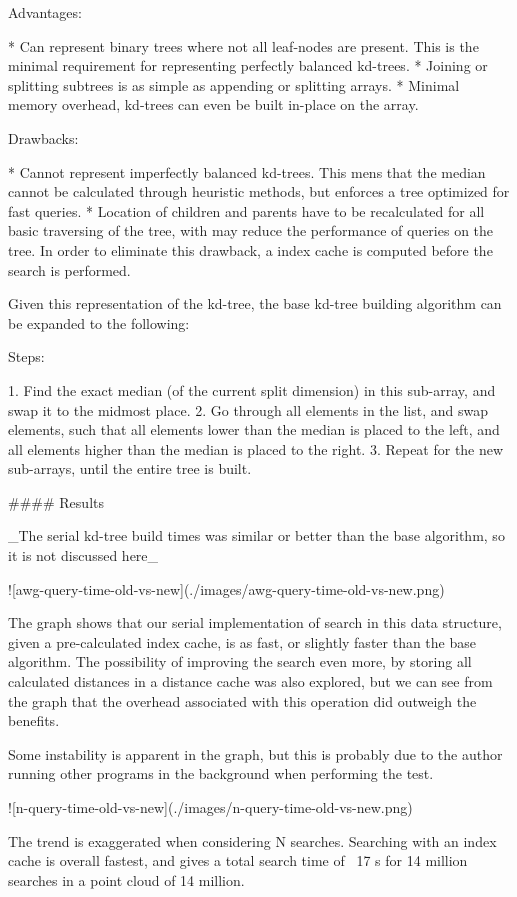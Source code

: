 Advantages:

* Can represent binary trees where not all leaf-nodes are present. This is the minimal requirement for representing perfectly balanced kd-trees.
* Joining or splitting subtrees is as simple as appending or splitting arrays.
* Minimal memory overhead, kd-trees can even be built in-place on the array.

Drawbacks:

* Cannot represent imperfectly balanced kd-trees. This mens that the median cannot be calculated through heuristic methods, but enforces a tree optimized for fast queries.
* Location of children and parents have to be recalculated for all basic traversing of the tree, with may reduce the performance of queries on the tree. In order to eliminate this drawback, a index cache is computed before the search is performed.

Given this representation of the kd-tree, the base kd-tree building algorithm can be expanded to the following:

Steps:

1. Find the exact median (of the current split dimension) in this sub-array, and swap it to the midmost place.
2. Go through all elements in the list, and swap elements, such that all elements lower than the median is placed to the left, and all elements higher than the median is placed to the right.
3. Repeat for the new sub-arrays, until the entire tree is built.

#### Results

_The serial kd-tree build times was similar or better than the base algorithm, so it is not discussed here_

![awg-query-time-old-vs-new](./images/awg-query-time-old-vs-new.png)

The graph shows that our serial implementation of search in this data structure, given a pre-calculated index cache, is as fast, or slightly faster than the base algorithm. The possibility of improving the search even more, by storing all calculated distances in a distance cache was also explored, but we can see from the graph that the overhead associated with this operation did outweigh the benefits.

Some instability is apparent in the graph, but this is probably due to the author running other programs in the background when performing the test.

![n-query-time-old-vs-new](./images/n-query-time-old-vs-new.png)

The trend is exaggerated when considering N searches. Searching with an index cache is overall fastest, and gives a total search time of ~17 s for 14 million searches in a point cloud of 14 million.


